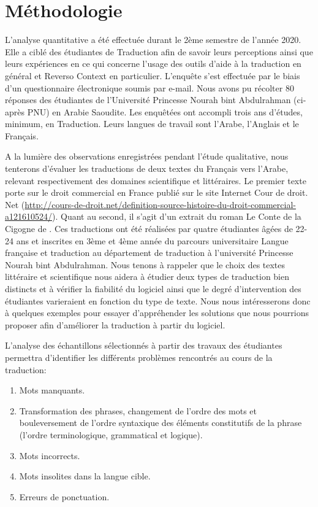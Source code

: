 \documentclass{textolivre}
\begin{document}
\section{Méthodologie}\label{sec-metodologia}
L’analyse quantitative a été effectuée durant le 2ème semestre de l’année 2020. Elle a ciblé des étudiantes de Traduction afin de savoir leurs perceptions ainsi que leurs expériences en ce qui concerne l’usage des outils d’aide à la traduction en général et Reverso Context en particulier. L’enquête s’est effectuée par le biais d’un questionnaire électronique soumis par e-mail. Nous avons pu récolter 80 réponses des étudiantes de l’Université Princesse Nourah bint Abdulrahman (ci-après PNU) en Arabie Saoudite. Les enquêtées ont accompli trois ans d’études, minimum, en Traduction. Leurs langues de travail sont l’Arabe, l’Anglais et le Français.

 A la lumière des observations enregistrées pendant l’étude qualitative, nous tenterons d’évaluer les traductions de deux textes du Français vers l’Arabe, relevant respectivement des domaines scientifique et littéraires. Le premier texte porte sur le droit commercial en France publié sur le site Internet Cour de droit. Net (\url{http://cours-de-droit.net/definition-source-histoire-du-droit-commercial-a121610524/}). Quant au second, il s’agit d’un extrait du roman Le Conte de la Cigogne de \textcite{maza2017}. Ces traductions ont été réalisées par quatre étudiantes âgées de 22-24 ans et inscrites en 3ème et 4ème année du parcours universitaire Langue française et traduction au département de traduction à l’université Princesse Nourah bint Abdulrahman. Nous tenons à rappeler que le choix des textes littéraire et scientifique nous aidera à étudier deux types de traduction bien distincts et à vérifier la fiabilité du logiciel ainsi que le degré d’intervention des étudiantes varieraient en fonction du type de texte. Nous nous intéresserons donc à quelques exemples pour essayer d’appréhender les solutions que nous pourrions proposer afin d’améliorer la traduction à partir du logiciel. 
 
L'analyse des échantillons sélectionnés à partir des travaux des étudiantes permettra d’identifier les différents problèmes rencontrés au cours de la traduction:

\begin{enumerate}
\item Mots manquants.
\item Transformation des phrases, changement de l’ordre des mots et bouleversement de l’ordre syntaxique des éléments constitutifs de la phrase (l’ordre terminologique, grammatical et logique).
\item Mots incorrects.
\item Mots insolites dans la langue cible.
\item Erreurs de ponctuation.
\end{enumerate}
    
\end{document}
